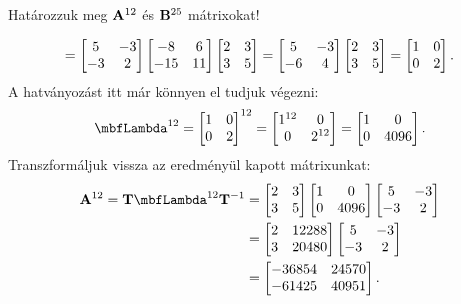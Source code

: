 \begin{exercise}{Határozzuk meg $\mathbf{A}^{12}$ és $\mathbf{B}^{25}$ mátrixokat!}
{\[    = \begin{bmatrix}
      5  & -3 \\
      -3 & 2
    \end{bmatrix} \begin{bmatrix}
      -8  & 6  \\
      -15 & 11
    \end{bmatrix} \begin{bmatrix}
      2 & 3 \\
      3 & 5
    \end{bmatrix}
    =
    \begin{bmatrix}
      5  & -3 \\
      -6 & 4
    \end{bmatrix} \begin{bmatrix}
      2 & 3 \\
      3 & 5
    \end{bmatrix}
    =
    \begin{bmatrix}
      1 & 0 \\
      0 & 2
    \end{bmatrix}
    \text.
  \]
  A hatványozást itt már könnyen el tudjuk végezni:
  \[
    \mbfLambda^{12}
    = \begin{bmatrix} 1 & 0 \\ 0 & 2 \end{bmatrix}^{12}
    = \begin{bmatrix} 1^{12} & 0 \\ 0 & 2^{12} \end{bmatrix}
    = \begin{bmatrix} 1 & 0 \\ 0 & 4096  \end{bmatrix}
    \text.
  \]
  Transzformáljuk vissza az eredményül kapott mátrixunkat:
  \begin{align*}
    \rmat A^{12} = \rmat T \mbfLambda^{12} \rmat T^{-1}
     & =
    \begin{bmatrix} 2 & 3 \\ 3 & 5 \end{bmatrix}
    \begin{bmatrix} 1 & 0 \\ 0 & 4096 \end{bmatrix}
    \begin{bmatrix} 5  & -3 \\ -3 & 2 \end{bmatrix}
    \\
     & =
    \begin{bmatrix} 2 & 12288 \\ 3 & 20480 \end{bmatrix}
    \begin{bmatrix} 5  & -3 \\ -3 & 2 \end{bmatrix}
    \\
     & =
    \begin{bmatrix}
      -36854 & 24570 \\
      -61425 & 40951
    \end{bmatrix}
    \text.
  \end{align*}

}
\end{exercise}
